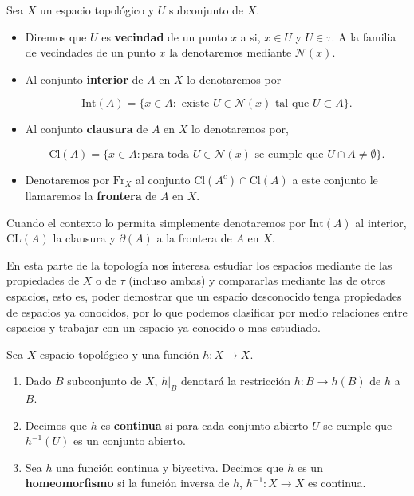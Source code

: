 \begin{df}
Sea $X$ un espacio topológico y $U$ subconjunto de $X$.

\begin{itemize}
	\item Diremos que $U$ es \textbf{vecindad} de un punto $x$ a si, $x \in U$ y $U \in \tau$. A la familia de vecindades de un punto $x$ la denotaremos mediante $\mathcal{N}(x)$.
	\item Al conjunto \textbf{interior} de $A$ en $X$ lo denotaremos por 
 
  $$\mathrm{Int}(A)=\{x \in A: \text{ existe } U \in \mathcal{N}(x) \text{ tal que } U \subset A\}.$$
  
	\item  Al conjunto  \textbf{clausura} de $A$ en $X$ lo denotaremos por, 
  
$$\mathrm{Cl}(A)=\{x \in A: \text{para toda } U \in \mathcal{N}(x) \text{ se cumple  que } U \cap A \neq \emptyset\}.$$
	
	\item Denotaremos por  $\mathrm{Fr}_X$ al conjunto $\mathrm{Cl}(A^c) \cap \mathrm{Cl}(A) $ a este conjunto le llamaremos la 
  \textbf{frontera} de $A$ en $X$.
 \end{itemize}
\end{df}

\begin{cn}
Cuando el contexto lo permita simplemente denotaremos por $\mathrm{Int}(A)$ al interior, $\mathrm{CL}(A)$ la clausura y  $\partial(A)$ a la frontera de $A$ en $X$.
\end{cn}


En esta parte de la topología nos interesa estudiar los espacios mediante de las propiedades de $X$ o de $\tau$ (incluso ambas) y compararlas mediante las de otros espacios, esto es, poder demostrar que un espacio desconocido tenga propiedades de espacios ya conocidos, por lo que podemos clasificar por medio relaciones entre espacios y trabajar con un espacio ya conocido o mas estudiado.

\begin{df}
Sea $X$ espacio topológico y una función $h:X \to X$. 
\begin{enumerate}

	\item Dado $B$ subconjunto de $X$, $h|_B$ denotará la restricción $h:B \to h(B)$ de $h$ a $B$. 
	
	\item  Decimos que $h$ es \textbf{continua} si para cada conjunto abierto $U$ se cumple que $h^{-1}(U)$ es un conjunto abierto.
	
	\item  Sea $h$ una función continua y biyectiva. Decimos que $h$ es un \textbf{homeomorfismo} si la función inversa de $h$, $h^{-1}:X \to X$ es continua. 	
\end{enumerate}
\end{df}


